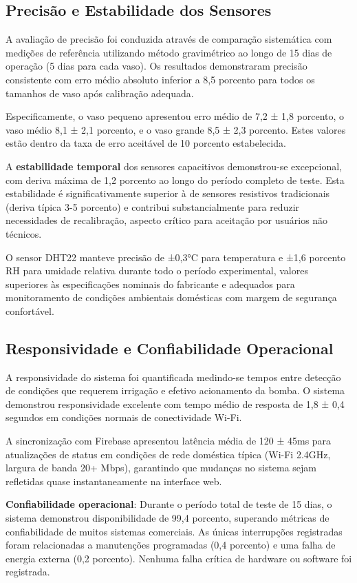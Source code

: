 \documentclass[twoside,english,brazilian]{UNISINOSmonografia}
\begin{document}
\subsection{Precisão e Estabilidade dos Sensores}

A avaliação de precisão foi conduzida através de comparação sistemática com medições de referência utilizando método gravimétrico ao longo de 15 dias de operação (5 dias para cada vaso). Os resultados demonstraram precisão consistente com erro médio absoluto inferior a 8,5 porcento para todos os tamanhos de vaso após calibração adequada.

Especificamente, o vaso pequeno apresentou erro médio de 7,2 ± 1,8 porcento, o vaso médio 8,1 ± 2,1 porcento, e o vaso grande 8,5 ± 2,3 porcento. Estes valores estão dentro da taxa de erro aceitável de 10 porcento estabelecida.

A \textbf{estabilidade temporal} dos sensores capacitivos demonstrou-se excepcional, com deriva máxima de 1,2 porcento ao longo do período completo de teste. Esta estabilidade é significativamente superior à de sensores resistivos tradicionais (deriva típica 3-5 porcento) e contribui substancialmente para reduzir necessidades de recalibração, aspecto crítico para aceitação por usuários não técnicos.

O sensor DHT22 manteve precisão de ±0,3°C para temperatura e ±1,6 porcento RH para umidade relativa durante todo o período experimental, valores superiores às especificações nominais do fabricante e adequados para monitoramento de condições ambientais domésticas com margem de segurança confortável.

\subsection{Responsividade e Confiabilidade Operacional}

A responsividade do sistema foi quantificada medindo-se tempos entre detecção de condições que requerem irrigação e efetivo acionamento da bomba. O sistema demonstrou responsividade excelente com tempo médio de resposta de 1,8 ± 0,4 segundos em condições normais de conectividade Wi-Fi.

A sincronização com Firebase apresentou latência média de 120 ± 45ms para atualizações de status em condições de rede doméstica típica (Wi-Fi 2.4GHz, largura de banda 20+ Mbps), garantindo que mudanças no sistema sejam refletidas quase instantaneamente na interface web.

\textbf{Confiabilidade operacional}: Durante o período total de teste de 15 dias, o sistema demonstrou disponibilidade de 99,4 porcento, superando métricas de confiabilidade de muitos sistemas comerciais. As únicas interrupções registradas foram relacionadas a manutenções programadas (0,4 porcento) e uma falha de energia externa (0,2 porcento). Nenhuma falha crítica de hardware ou software foi registrada.
\end{document}
